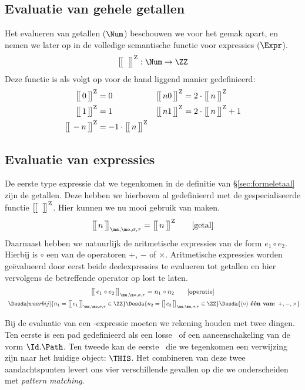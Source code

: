 \subsection{Evaluatie van gehele getallen}

Het evalueren van getallen ($\Num$) beschouwen we voor het gemak apart, en nemen we later op in de volledige semantische functie voor expressies ($\Expr$).
%
\begin{equation*}
  \Express[Z]{\;}{} : \Num \to \ZZ \\
\end{equation*}
%
Deze functie is als volgt op voor de hand liggend manier gedefinieerd:
%
\begin{align*}
  \Express[Z]{0}{} &= 0 &
  \Express[Z]{n 0}{} &= 2 \cdot \Express[Z]{n}{} \\
  \Express[Z]{1}{} &= 1 &
  \Express[Z]{n 1}{} &= 2 \cdot \Express[Z]{n}{} + 1 \\
  \Express[Z]{-n}{} &= -1 \cdot \Express[Z]{n}{}
\end{align*}

\subsection{Evaluatie van expressies}

De eerste type expressie dat we tegenkomen in de definitie van §\ref{sec:formeletaal} zijn de getallen. Deze hebben we hierboven al gedefinieerd met de gespecialiseerde functie $\Express[Z]{\;}{}$. Hier kunnen we nu mooi gebruik van maken.
%
\begin{equation*}
  \Express{n}{\ms,\mo,\sigma,\tau} = \Express[Z]{n}{}
  \tag*{[getal]}
\end{equation*}
%
Daarnaast hebben we natuurlijk de aritmetische expressies van de form $e_1 \circ e_2$. Hierbij is $\circ$ een van de operatoren $+$, $-$ of $\times$. Aritmetische expressies worden geëvalueerd door eerst beide deelexpressies te evalueren tot getallen en hier vervolgens de betreffende operator op lost te laten.
%
\begin{gather*}
  \Express{e_1 \circ e_2}{\ms,\mo,\sigma,\tau} = n_1 \circ n_2
  \tag*{[operatie]} \\
  \Desdas{
    \Desda[waarbij]{n_1 = \Express{e_1}{\ms,\mo,\sigma,\tau} \in \ZZ}
    \Desda{n_2 = \Express{e_2}{\ms,\mo,\sigma,\tau} \in \ZZ}
    \Desda{(\circ) \textbf{ één van: } +, -, \times}
  }
\end{gather*}

Bij de evaluatie van een \Path-expressie moeten we rekening houden met twee dingen. Ten eerste is een pad gedefinieerd als een losse \Id\ of een aaneenschakeling van de vorm $\Id.\Path$. Ten tweede kan de eerste \Id\ die we tegenkomen een verwijzing zijn naar het huidige object: $\THIS$. Het combineren van deze twee aandachtspunten levert ons vier verschillende gevallen op die we onderscheiden met \emph{pattern matching}.

